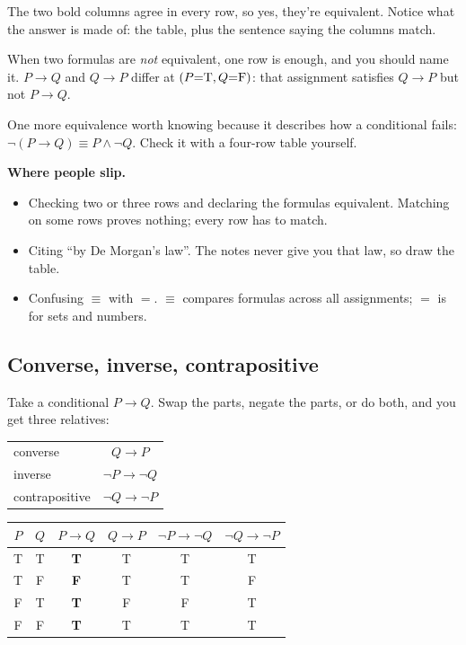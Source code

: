 The two bold columns agree in every row, so yes, they're equivalent. Notice what the answer is made of: the table, plus the sentence saying the columns match.

When two formulas are \emph{not} equivalent, one row is enough, and you should name it. $P\to Q$ and $Q\to P$ differ at $(P{=}\mathrm{T},Q{=}\mathrm{F})$: that assignment satisfies $Q\to P$ but not $P\to Q$.

One more equivalence worth knowing because it describes how a conditional fails: $\lnot(P\to Q)\equiv P\land\lnot Q$. Check it with a four-row table yourself.

\textbf{Where people slip.}
\begin{itemize}
  \item Checking two or three rows and declaring the formulas equivalent. Matching on some rows proves nothing; every row has to match.
  \item Citing ``by De Morgan's law''. The notes never give you that law, so draw the table.
  \item Confusing $\equiv$ with $=$. $\equiv$ compares formulas across all assignments; $=$ is for sets and numbers.
\end{itemize}

\subsection{Converse, inverse, contrapositive}

Take a conditional $P\to Q$. Swap the parts, negate the parts, or do both, and you get three relatives:

\begin{center}
\begin{tabular}{lc}
\toprule
converse & $Q\to P$\\
inverse & $\lnot P\to\lnot Q$\\
contrapositive & $\lnot Q\to\lnot P$\\
\bottomrule
\end{tabular}
\qquad
\begin{tabular}{cc|>{\bfseries}cccc}
\toprule
$P$ & $Q$ & $P\to Q$ & $Q\to P$ & $\lnot P\to\lnot Q$ & $\lnot Q\to\lnot P$\\
\midrule
T & T & T & T & T & T\\
T & F & F & T & T & F\\
F & T & T & F & F & T\\
F & F & T & T & T & T\\
\bottomrule
\end{tabular}
\end{center}

